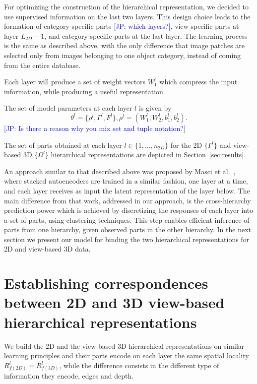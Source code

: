\documentclass[runningheads]{llncs}
\newcommand{\commentJP}[1]{\textcolor{blue}{[JP: #1]}}
\begin{document}
For optimizing the construction of the hierarchical representation, we decided to use supervised information on the last two layers. This design choice leads to the formation of category-specific parts \commentJP{which layers?}, view-specific parts at layer $L_{2D}-1$, and category-specific parts at the last layer. The learning process is the same as described above, with the only difference that image patches are selected only from images belonging to one object category, instead of coming from the entire database.    

Each layer will produce a set of weight vectors $W_1^l$ which compress the input information, while producing a useful representation. 

The set of model parameters at each layer $l$ is  given by
\begin{equation}
\theta^l = \{\rho^l,\Gamma^l,F^l\},
\rho^l=(W_1^l,W_2^l,b_1^l,b_2^l).
\end{equation}
\commentJP{Is there a reason why you mix set and tuple notation?}

The set of parts obtained at each layer $l\in\{1,\ldots,n_{2D}\}$ for the 2D $\{\Gamma^l\}$ and view-based 3D $\{\Omega^l\}$ hierarchical representations are depicted in Section~\ref{sec:results}.

An approach similar to that described above was proposed by Masci et al.~\cite{Masci2011}, where stacked autoencoders are trained in a similar fashion, one layer at a time, and each layer receives as input the latent representation of the layer below. The main difference from that work, addressed in our approach, is the cross-hierarchy prediction power which is achieved by discretizing the responses of each layer into a set of parts, using clustering techniques. This step enables efficient inference of parts from one hierarchy, given observed parts in the other hierarchy. In the next section we present our model for binding the two hierarchical representations for 2D and view-based 3D data.
 
\section{Establishing correspondences between 2D and 3D view-based hierarchical representations}
\label{sec:analysis}

We build the 2D and the view-based 3D hierarchical representations on similar learning principles and their parts encode on each layer the same spatial locality $R_{f(2D)}^l=R_{f(3D)}^l$, while the difference consists in the different type of information they encode, edges and depth.
	
\end{document}
